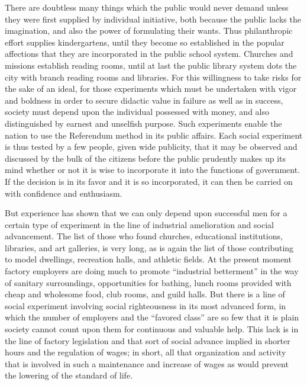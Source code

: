 \documentclass[]{article}
\begin{document}
\begin{sectionbody}
\addamsparagraph There are doubtless many things which the public would never demand
unless they were first supplied by individual initiative, both because
the public lacks the imagination, and also the power of formulating
their wants. Thus philanthropic effort supplies kindergartens, until
they become so established in the popular affections that they are
incorporated in the public school system. Churches and missions
establish reading rooms, until at last the public library system dots
the city with branch reading rooms and libraries. For this willingness
to take risks for the sake of an ideal, for those experiments which must
be undertaken with vigor and boldness in order to secure didactic value
in failure as well as in success, society must depend upon the
individual possessed with money, and also distinguished by earnest and
unselfish purpose. Such experiments enable the nation to use the
Referendum method in its public affairs. Each social experiment is thus
tested by a few people, given wide publicity, that it may be observed
and discussed by the bulk of the citizens before the public prudently
makes up its mind whether or not it is wise to incorporate it into the
functions of government. If the decision is in its favor and it is so
incorporated, it can then be carried on with confidence and enthusiasm.

\addamsparagraph But experience has shown that we can only depend upon successful men for
a certain type of experiment in the line of industrial amelioration and
social advancement. The list of those who found churches, educational
institutions, libraries, and art galleries, is very long, as is again
the list of those contributing to model dwellings, recreation halls, and
athletic fields. At the present moment factory employers are doing much
to promote ``industrial betterment'' in the way of sanitary surroundings,
opportunities for bathing, lunch rooms provided with cheap and wholesome
food, club rooms, and guild halls. But there is a line of social
experiment involving social righteousness in its most advanced form, in
which the number of employers and the ``favored class'' are so few that it
is plain society cannot count upon them for continuous and valuable
help. This lack is in the line of factory legislation and that sort of
social advance implied in shorter hours and the regulation of wages; in
short, all that organization and activity that is involved in such a
maintenance and increase of wages as would prevent the lowering of the
standard of life.


\end{sectionbody}
\end{document}
